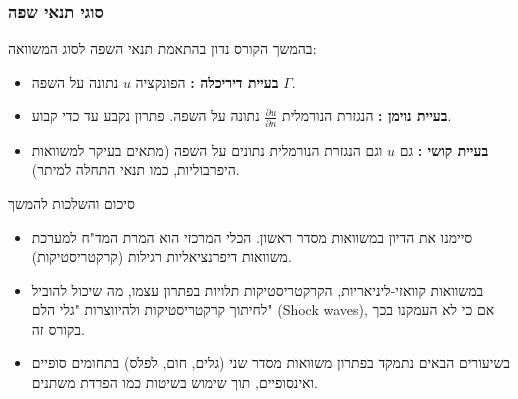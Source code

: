 \subsubsection{סוגי תנאי שפה}
בהמשך הקורס נדון בהתאמת תנאי השפה לסוג המשוואה:
\begin{itemize}
    \item \textbf{בעיית דיריכלה :} הפונקציה $u$ נתונה על השפה $\Gamma$.
    \item \textbf{בעיית נוימן :} הנגזרת הנורמלית $\frac{\partial u}{\partial n}$ נתונה על השפה. פתרון נקבע עד כדי קבוע.
    \item \textbf{בעיית קושי :} גם $u$ וגם הנגזרת הנורמלית נתונים על השפה (מתאים בעיקר למשוואות היפרבוליות, כמו תנאי התחלה למיתר).
\end{itemize}

\begin{summarybox}{סיכום והשלכות להמשך}
\begin{itemize}
    \item סיימנו את הדיון במשוואות מסדר ראשון. הכלי המרכזי הוא המרת המד"ח למערכת משוואות דיפרנציאליות רגילות (קרקטריסטיקות).
    \item במשוואות קוואזי-ליניאריות, הקרקטריסטיקות תלויות בפתרון עצמו, מה שיכול להוביל לחיתוך קרקטריסטיקות ולהיווצרות "גלי הלם" (Shock waves), אם כי לא העמקנו בכך בקורס זה.
    \item בשיעורים הבאים נתמקד בפתרון משוואות מסדר שני (גלים, חום, לפלס) בתחומים סופיים ואינסופיים, תוך שימוש בשיטות כמו הפרדת משתנים.
\end{itemize}
\end{summarybox}